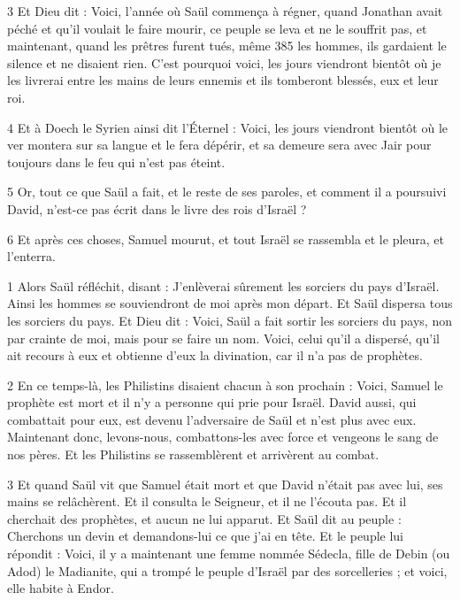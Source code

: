 \par 3 Et Dieu dit : Voici, l'année où Saül commença à régner, quand Jonathan avait péché et qu'il voulait le faire mourir, ce peuple se leva et ne le souffrit pas, et maintenant, quand les prêtres furent tués, même 385 les hommes, ils gardaient le silence et ne disaient rien. C'est pourquoi voici, les jours viendront bientôt où je les livrerai entre les mains de leurs ennemis et ils tomberont blessés, eux et leur roi.

\par 4 Et à Doech le Syrien ainsi dit l'Éternel : Voici, les jours viendront bientôt où le ver montera sur sa langue et le fera dépérir, et sa demeure sera avec Jair pour toujours dans le feu qui n'est pas éteint.

\par 5 Or, tout ce que Saül a fait, et le reste de ses paroles, et comment il a poursuivi David, n'est-ce pas écrit dans le livre des rois d'Israël ?

\par 6 Et après ces choses, Samuel mourut, et tout Israël se rassembla et le pleura, et l'enterra.


\par 1 Alors Saül réfléchit, disant : J'enlèverai sûrement les sorciers du pays d'Israël. Ainsi les hommes se souviendront de moi après mon départ. Et Saül dispersa tous les sorciers du pays. Et Dieu dit : Voici, Saül a fait sortir les sorciers du pays, non par crainte de moi, mais pour se faire un nom. Voici, celui qu'il a dispersé, qu'il ait recours à eux et obtienne d'eux la divination, car il n'a pas de prophètes.

\par 2 En ce temps-là, les Philistins disaient chacun à son prochain : Voici, Samuel le prophète est mort et il n'y a personne qui prie pour Israël. David aussi, qui combattait pour eux, est devenu l'adversaire de Saül et n'est plus avec eux. Maintenant donc, levons-nous, combattons-les avec force et vengeons le sang de nos pères. Et les Philistins se rassemblèrent et arrivèrent au combat.

\par 3 Et quand Saül vit que Samuel était mort et que David n'était pas avec lui, ses mains se relâchèrent. Et il consulta le Seigneur, et il ne l'écouta pas. Et il cherchait des prophètes, et aucun ne lui apparut. Et Saül dit au peuple : Cherchons un devin et demandons-lui ce que j'ai en tête. Et le peuple lui répondit : Voici, il y a maintenant une femme nommée Sédecla, fille de Debin (ou Adod) le Madianite, qui a trompé le peuple d'Israël par des sorcelleries ; et voici, elle habite à Endor.

